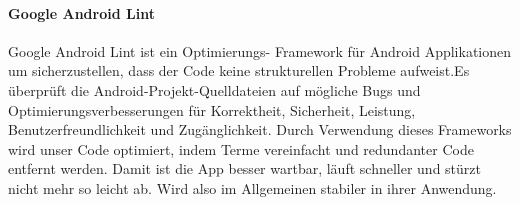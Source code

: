 	\paragraph{Google Android Lint}
	Google Android Lint ist ein Optimierungs- Framework für Android Applikationen um sicherzustellen, dass der Code keine strukturellen Probleme aufweist.Es überprüft die Android-Projekt-Quelldateien auf mögliche Bugs und Optimierungsverbesserungen für Korrektheit, Sicherheit, Leistung, Benutzerfreundlichkeit und Zugänglichkeit.
	Durch Verwendung dieses Frameworks wird unser Code optimiert, indem Terme vereinfacht und redundanter Code entfernt werden. Damit ist die App besser wartbar, läuft schneller und stürzt nicht mehr so leicht ab. Wird also im Allgemeinen stabiler in ihrer Anwendung.
	







